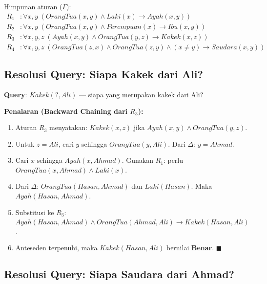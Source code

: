 Himpunan aturan ($\Gamma$):
\begin{align*}
R_1&: \forall x, y \; (OrangTua(x, y) \wedge Laki(x) \rightarrow Ayah(x,y)) \\
R_2&: \forall x, y \; (OrangTua(x, y) \wedge Perempuan(x) \rightarrow Ibu(x,y)) \\
R_3&: \forall x, y, z \; (Ayah(x, y) \wedge OrangTua(y, z) \rightarrow Kakek(x,z)) \\
R_4&: \forall x, y, z \; (OrangTua(z, x) \wedge OrangTua(z, y) \wedge (x \neq y) \rightarrow Saudara(x, y))
\end{align*}

\subsection{Resolusi Query: Siapa Kakek dari Ali?}

\begin{contoh}
\textbf{Query}: $Kakek(?, Ali)$ --- siapa yang merupakan kakek dari Ali?

\textbf{Penalaran (Backward Chaining dari $R_3$):}
\begin{enumerate}
    \item Aturan $R_3$ menyatakan: $Kakek(x, z)$ jika $Ayah(x, y) \wedge OrangTua(y, z)$.
    \item Untuk $z = Ali$, cari $y$ sehingga $OrangTua(y, Ali)$. Dari $\Delta$: $y = Ahmad$.
    \item Cari $x$ sehingga $Ayah(x, Ahmad)$. Gunakan $R_1$: perlu $OrangTua(x, Ahmad) \wedge Laki(x)$.
    \item Dari $\Delta$: $OrangTua(Hasan, Ahmad)$ dan $Laki(Hasan)$. Maka $Ayah(Hasan, Ahmad)$.
    \item Substitusi ke $R_3$: $Ayah(Hasan, Ahmad) \wedge OrangTua(Ahmad, Ali) \rightarrow Kakek(Hasan, Ali)$.
    \item Anteseden terpenuhi, maka $Kakek(Hasan, Ali)$ bernilai \textbf{Benar}. $\blacksquare$
\end{enumerate}
\end{contoh}

\subsection{Resolusi Query: Siapa Saudara dari Ahmad?}

